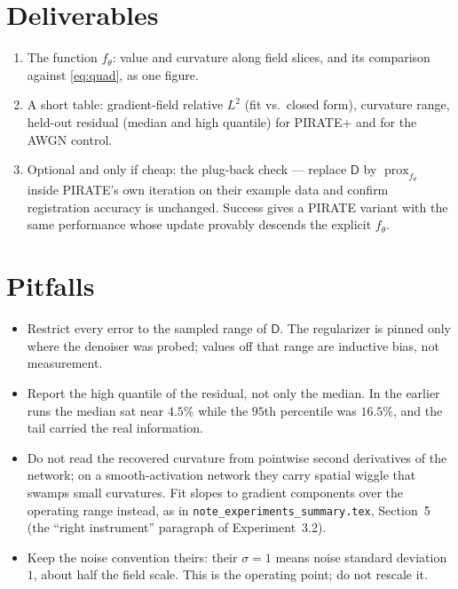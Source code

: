 \documentclass[11pt]{article}
\newcommand{\D}{\mathsf{D}}
\newcommand{\prox}{\operatorname{prox}}
\newcommand{\code}[1]{\texttt{#1}}
\begin{document}
\section{Deliverables}

\begin{enumerate}
\item The function $f_\theta$: value and curvature along field slices, and its comparison against \eqref{eq:quad}, as one figure.
\item A short table: gradient-field relative $L^2$ (fit vs.\ closed form), curvature range, held-out residual (median and high quantile) for PIRATE+ and for the AWGN control.
\item Optional and only if cheap: the plug-back check --- replace $\D$ by $\prox_{f_\theta}$ inside PIRATE's own iteration on their example data and confirm registration accuracy is unchanged. Success gives a PIRATE variant with the same performance whose update provably descends the explicit $f_\theta$.
\end{enumerate}

\section{Pitfalls}

\begin{itemize}
\item Restrict every error to the sampled range of $\D$. The regularizer is pinned only where the denoiser was probed; values off that range are inductive bias, not measurement.
\item Report the high quantile of the residual, not only the median. In the earlier runs the median sat near $4.5\%$ while the $95$th percentile was $16.5\%$, and the tail carried the real information.
\item Do not read the recovered curvature from pointwise second derivatives of the network; on a smooth-activation network they carry spatial wiggle that swamps small curvatures. Fit slopes to gradient components over the operating range instead, as in \code{note\_experiments\_summary.tex}, Section~5 (the ``right instrument'' paragraph of Experiment~3.2).
\item Keep the noise convention theirs: their $\sigma = 1$ means noise standard deviation $1$, about half the field scale. This is the operating point; do not rescale it.
\end{itemize}
\end{document}
